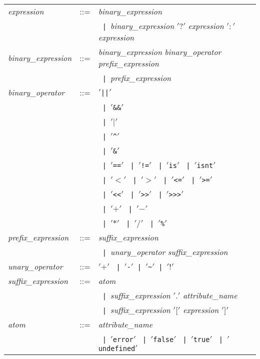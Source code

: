 \documentclass{article}
\newcommand{\qc}[1]{$' \mathtt{#1} '$}
\newcommand{\apos}{$'$}
\newcommand{\alt}{~\texttt{|}~}
\begin{document}
\begin{table}[htb!]
\begin{center}
\begin{tabular}{lcl}
\emph{expression} & ::= &
    \emph{binary\_expression} \\
    && \alt \emph{binary\_expression}
                \qc{?} \emph{expression}  \qc{:}  \emph{expression} \\
\emph{binary\_expression} & ::= &
    \emph{binary\_expression}
        \emph{binary\_operator}
        \emph{prefix\_expression} \\
    && \alt \emph{prefix\_expression} \\
\emph{binary\_operator} & ::= &
    \apos\verb/||/\apos \\
    && \alt \apos\verb/&&/\apos \\
    && \alt \qc{|} \\
    && \alt \apos\verb/^/\apos \\
    && \alt \apos\verb/&/\apos \\
    && \alt \apos\verb/==/\apos
          \alt \apos\verb/!=/\apos
          \alt \apos\verb/is/\apos
          \alt \apos\verb/isnt/\apos \\
    && \alt \qc{<}
           \alt \qc{>}
           \alt \apos\verb/<=/\apos
           \alt \apos\verb/>=/\apos \\
    && \alt \apos\verb/<</\apos
           \alt \apos\verb/>>/\apos
           \alt \apos\verb/>>>/\apos \\
    && \alt \qc{+} \alt \qc{-} \\
    && \alt \qc{*} \alt \qc{/} \alt \apos\verb/%/\apos \\
\emph{prefix\_expression} & ::= &
    \emph{suffix\_expression} \\
    && \alt \emph{unary\_operator} \emph{suffix\_expression} \\
\emph{unary\_operator} & ::= &
    \qc{+} \alt \apos\verb/-/\apos \alt \apos\verb/~/\apos \alt \qc{!} \\
\emph{suffix\_expression} & ::= &
    \emph{atom} \\
    && \alt \emph{suffix\_expression} \qc{.} \emph{attribute\_name} \\
    && \alt \emph{suffix\_expression} \qc{[} \emph{expression} \qc{]} \\
\emph{atom} & ::= &
    \emph{attribute\_name} \\
    && \alt \apos\verb/error/\apos
          \alt \apos\verb/false/\apos
          \alt \apos\verb/true/\apos
          \alt \apos\verb/undefined/\apos

\end{tabular}
\end{center}
\end{table}
\end{document}
